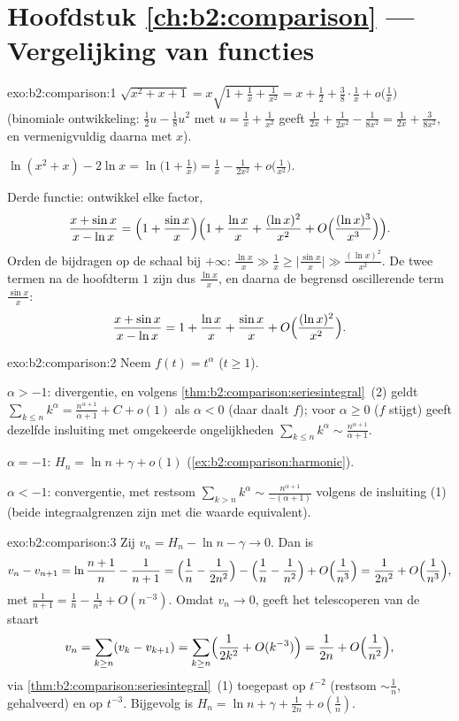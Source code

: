 \section*{Hoofdstuk \ref{ch:b2:comparison} --- Vergelijking van functies}

\begin{solution}{exo:b2:comparison:1}
$\sqrt{x^2 + x + 1} = x\sqrt{1 + \tfrac1x + \tfrac{1}{x^2}} = x +
\frac12 + \frac38\cdot\frac1x + o\bigl(\frac1x\bigr)$ (binomiale
ontwikkeling: $\frac12 u - \frac18 u^2$ met $u = \frac1x +
\frac{1}{x^2}$ geeft $\frac{1}{2x} + \frac{1}{2x^2} -
\frac{1}{8x^2} = \frac{1}{2x} + \frac{3}{8x^2}$, en vermenigvuldig
daarna met $x$).

$\ln(x^2 + x) - 2\ln x = \ln\bigl(1 + \tfrac1x\bigr) = \frac1x -
\frac{1}{2x^2} + o\bigl(\frac{1}{x^2}\bigr)$.

Derde functie: ontwikkel elke factor,
\[
\frac{x + \sin x}{x - \ln x}
= \Bigl(1 + \frac{\sin x}{x}\Bigr)
\Bigl(1 + \frac{\ln x}{x} + \frac{(\ln x)^2}{x^2} +
O\Bigl(\frac{(\ln x)^3}{x^3}\Bigr)\Bigr).
\]
Orden de bijdragen op de schaal bij $+\infty$: $\frac{\ln x}{x}
\gg \frac{1}{x} \geq \bigl|\frac{\sin x}{x}\bigr| \gg \frac{(\ln
x)^2}{x^2}$. De twee termen na de hoofdterm $1$ zijn dus
$\frac{\ln x}{x}$, en daarna de begrensd oscillerende term
$\frac{\sin x}{x}$:
\[
\frac{x + \sin x}{x - \ln x}
= 1 + \frac{\ln x}{x} + \frac{\sin x}{x}
+ O\Bigl(\frac{(\ln x)^2}{x^2}\Bigr).
\]
\end{solution}

\begin{solution}{exo:b2:comparison:2}
Neem $f(t) = t^\alpha$ ($t \geq 1$).

$\alpha > -1$: divergentie, en volgens
\cref{thm:b2:comparison:seriesintegral}~(2) geldt $\sum_{k\leq n}
k^\alpha = \frac{n^{\alpha+1}}{\alpha+1} + C + o(1)$ als $\alpha <
0$ (daar daalt $f$); voor $\alpha \geq 0$ ($f$ stijgt) geeft
dezelfde insluiting met omgekeerde ongelijkheden $\sum_{k \leq n}
k^\alpha \sim \frac{n^{\alpha + 1}}{\alpha + 1}$.

$\alpha = -1$: $H_n = \ln n + \gamma + o(1)$
(\cref{ex:b2:comparison:harmonic}).

$\alpha < -1$: convergentie, met restsom $\sum_{k > n} k^\alpha
\sim \frac{n^{\alpha+1}}{-(\alpha+1)}$ volgens de insluiting (1)
(beide integraalgrenzen zijn met die waarde equivalent).
\end{solution}

\begin{solution}{exo:b2:comparison:3}
Zij $v_n = H_n - \ln n - \gamma \to 0$. Dan is
\[
v_n - v_{n+1} = \ln\frac{n+1}{n} - \frac{1}{n+1}
= \Bigl(\frac1n - \frac{1}{2n^2}\Bigr) - \Bigl(\frac1n -
\frac{1}{n^2}\Bigr) + O\Bigl(\frac{1}{n^3}\Bigr)
= \frac{1}{2n^2} + O\Bigl(\frac{1}{n^3}\Bigr),
\]
met $\frac{1}{n+1} = \frac1n - \frac{1}{n^2} + O(n^{-3})$. Omdat
$v_n \to 0$, geeft het telescoperen van de staart
\[
v_n = \sum_{k \geq n} (v_k - v_{k+1})
= \sum_{k\geq n} \Bigl(\frac{1}{2k^2} + O(k^{-3})\Bigr)
= \frac{1}{2n} + O\Bigl(\frac{1}{n^2}\Bigr),
\]
via \cref{thm:b2:comparison:seriesintegral}~(1) toegepast op
$t^{-2}$ (restsom $\sim \frac1n$, gehalveerd) en op $t^{-3}$.
Bijgevolg is $H_n = \ln n + \gamma + \frac{1}{2n} +
o(\frac1n)$.
\end{solution}

